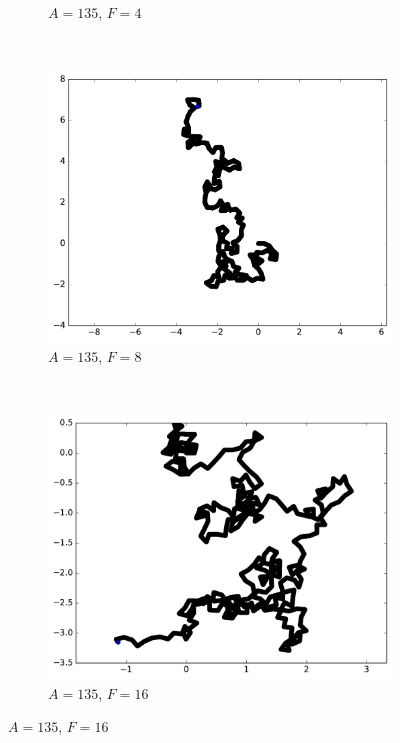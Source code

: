 \begin{figure}[htb]
\begin{subfigure}[t]{\subImgWmo}
			\caption[$A = 135$, $F=4$]{$A = 135$, $F=4$}
			\label{fig:synTraj_219_135_4}
		\end{subfigure}
		~
		\begin{subfigure}[t]{\subImgWmo}
			\centering
			\includegraphics[width=\textwidth]{figures/ch3/synTraj_219_135_8}
			\caption[$A = 135$, $F=8$]{$A = 135$, $F=8$}
			\label{fig:synTraj_219_135_8}
		\end{subfigure}
		~
		\begin{subfigure}[t]{\subImgWmo}
			\centering
			\includegraphics[width=\textwidth]{figures/ch3/synTraj_219_135_16}
			\caption[$A = 135$, $F=16$]{$A = 135$, $F=16$}
			\label{fig:synTraj_219_135_16}

\end{subfigure}
\end{figure}
